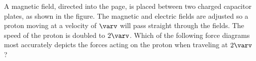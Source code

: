 \documentclass{../../../oss-classkick-exam}
\begin{document}
\begin{multicols*}{2}
\begin{questions}

%
%    
    \question A magnetic field, directed into the page, is placed between two
    charged capacitor plates, as shown in the figure. The magnetic and electric
    fields are adjusted so a proton moving at a velocity of $\varv$ will pass
    straight through the fields. The speed of the proton is doubled to $2\varv$.
    Which of the following force diagrams most accurately depicts the forces
    acting on the proton when traveling at $2\varv$?
    \begin{center}
    \end{center}
    \begin{choices}
      \choice
      

\end{choices}
\end{questions}
\end{multicols*}
\end{document}
